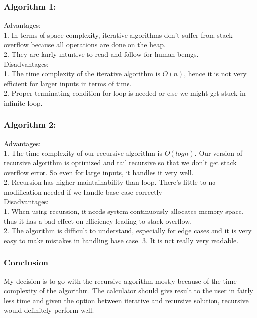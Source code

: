 \documentclass[a4paper, 11pt]{article}
\begin{document}
\subsubsection*{Algorithm 1:}
Advantages:\\
1. In terms of space complexity, iterative algorithms don't suffer from stack overflow because all operations are done on the heap. \\
2. They are fairly intuitive to read and follow for human beings.\\
Disadvantages:\\
1. The time complexity of the iterative algorithm is $O (n)$, hence it is not very efficient for larger inputs in terms of time.  \\
2. Proper terminating condition for loop is needed or else we might get stuck in infinite loop.
\subsubsection*{Algorithm 2:}
Advantages: \\
1. The time complexity of our recursive algorithm is $O (log n)$. Our version of recursive algorithm is optimized and tail recursive so that we don't get stack overflow error. So even for large inputs, it handles it very well. \\
2. Recursion has higher maintainability than loop. There's little to no modification needed if we handle base case correctly\\
Disadvantages:\\
1. When using recursion, it needs system continuously allocates memory space, thus it has a bad effect on efficiency leading to stack overflow. \\
2. The algorithm is difficult to understand, especially for edge cases and it is very easy to make mistakes in handling base case. 
3. It is not really very readable.
\subsubsection*{Conclusion}
My decision is to go with the recursive algorithm mostly because of the time complexity of the algorithm. The calculator should give result to the user in fairly less time and given the option between iterative and recursive solution, recursive would definitely perform well. 
\end{document}
